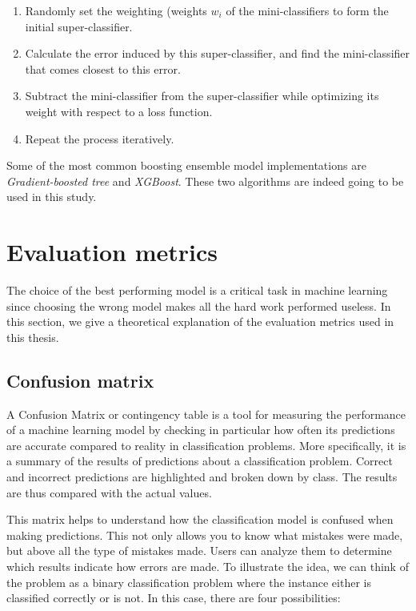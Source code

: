 \documentclass[LaM,binding=0.6cm, english]{sapthesis}
\begin{document}
\begin{enumerate}
	\item Randomly set the weighting (weights \(w_i\) of the mini-classifiers to form the initial super-classifier.
  	\item Calculate the error induced by this super-classifier, and find the mini-classifier that comes closest to this error.
  	\item Subtract the mini-classifier from the super-classifier while optimizing its weight with respect to a loss function.
  	\item Repeat the process iteratively.
\end{enumerate}

Some of the most common boosting ensemble model implementations are \textit{Gradient-boosted tree} and \textit{XGBoost}. These two algorithms are indeed going to be used in this study.


\section{Evaluation metrics}

The choice of the best performing model is a critical task in machine learning since choosing the wrong model makes all the hard work performed useless. In this section, we give a theoretical explanation of the evaluation metrics used in this thesis.

\subsection{Confusion matrix}

A Confusion Matrix or contingency table is a tool for measuring the performance of a machine learning model by checking in particular how often its predictions are accurate compared to reality in classification problems. More specifically, it is a summary of the results of predictions about a classification problem. Correct and incorrect predictions are highlighted and broken down by class. The results are thus compared with the actual values.

\par This matrix helps to understand how the classification model is confused when making predictions. This not only allows you to know what mistakes were made, but above all the type of mistakes made. Users can analyze them to determine which results indicate how errors are made. To illustrate the idea, we can think of the problem as a binary classification problem where the instance either is classified correctly or is not. In this case, there are four possibilities:
\end{document}
